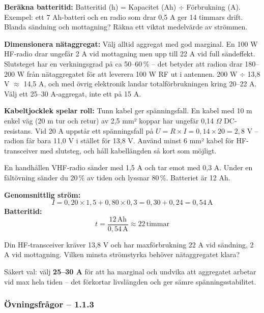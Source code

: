 \documentclass[a4paper,11pt,twoside]{book}
\begin{document}
\textbf{Beräkna batteritid:} Batteritid (h) = Kapacitet (Ah) $\div$ Förbrukning (A). Exempel: ett 7 Ah-batteri och en radio som drar 0,5 A ger 14 timmars drift. Blanda sändning och mottagning? Räkna ett viktat medelvärde av strömmen.

\textbf{Dimensionera nätaggregat:} Välj alltid aggregat med god marginal. En 100 W HF-radio drar ungefär 2 A vid mottagning men upp till 22 A vid full sändeffekt. Slutsteget har en verkningsgrad på ca 50–60\,\% – det betyder att radion drar 180–200 W från nätaggregatet för att leverera 100 W RF ut i antennen. 200 W $\div$ 13,8 V $\approx$ 14,5 A, och med övrig elektronik landar totalförbrukningen kring 20–22 A. Välj ett 25–30 A-aggregat, inte ett på 15 A.

\textbf{Kabeltjocklek spelar roll:} Tunn kabel ger spänningsfall. En kabel med 10 m enkel väg (20 m tur och retur) av 2,5 mm² koppar har ungefär 0,14 $\Omega$ DC-resistans. Vid 20 A uppstår ett spänningsfall på $U = R \times I = 0{,}14 \times 20 = 2{,}8$ V – radion får bara 11,0 V i stället för 13,8 V. Använd minst 6 mm² kabel för HF-transceiver med slutsteg, och håll kabellängden så kort som möjligt.

\begin{worked}[title={Räkneexempel 1.1.3-1 – Batteritid under fältövning}]
En handhållen VHF-radio sänder med 1,5 A och tar emot med 0,3 A. Under en fältövning sänder du 20\,\% av tiden och lyssnar 80\,\%. Batteriet är 12 Ah.

\textbf{Genomsnittlig ström:}
\[ I = 0{,}20 \times 1{,}5 + 0{,}80 \times 0{,}3 = 0{,}30 + 0{,}24 = 0{,}54\,\text{A} \]
\textbf{Batteritid:}
\[ t = \frac{12\,\text{Ah}}{0{,}54\,\text{A}} \approx 22\,\text{timmar} \]
\end{worked}

\begin{worked}[title={Räkneexempel 1.1.3-2 – Välja rätt nätaggregat}]
Din HF-transceiver kräver 13,8 V och har maxförbrukning 22 A vid sändning, 2 A vid mottagning. Vilken minsta strömstyrka behöver nätaggregatet klara?

Säkert val: välj \textbf{25–30 A} för att ha marginal och undvika att aggregatet arbetar vid max hela tiden – det förkortar livslängden och ger sämre spänningsstabilitet.
\end{worked}

\subsubsection*{Övningsfrågor – 1.1.3}
\end{document}
